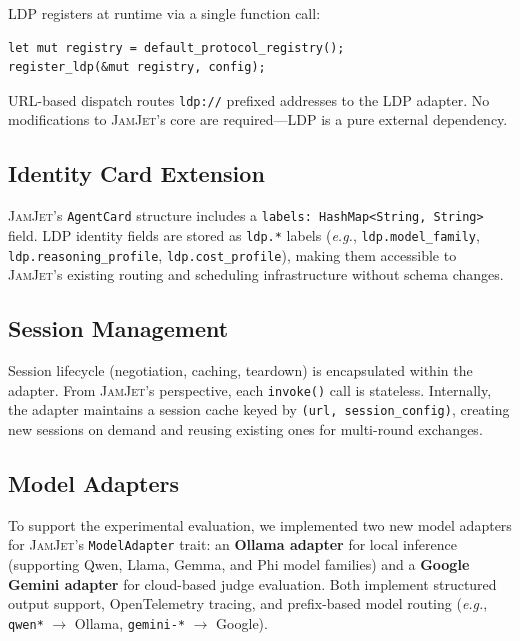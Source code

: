 \documentclass[11pt,a4paper]{article}
\newcommand{\ldp}{\textsc{LDP}}
\newcommand{\jamjet}{\textsc{JamJet}}
\newcommand{\eg}{\textit{e.g.}}
\begin{document}
\ldp{} registers at runtime via a single function call:

\begin{lstlisting}[style=protocol]
let mut registry = default_protocol_registry();
register_ldp(&mut registry, config);
\end{lstlisting}

\noindent URL-based dispatch routes \texttt{ldp://} prefixed addresses to the \ldp{} adapter. No modifications to \jamjet{}'s core are required---\ldp{} is a pure external dependency.

\subsection{Identity Card Extension}

\jamjet{}'s \texttt{AgentCard} structure includes a \texttt{labels: HashMap<String, String>} field. \ldp{} identity fields are stored as \texttt{ldp.*} labels (\eg{}, \texttt{ldp.model\_family}, \texttt{ldp.reasoning\_profile}, \texttt{ldp.cost\_profile}), making them accessible to \jamjet{}'s existing routing and scheduling infrastructure without schema changes.

\subsection{Session Management}

Session lifecycle (negotiation, caching, teardown) is encapsulated within the adapter. From \jamjet{}'s perspective, each \texttt{invoke()} call is stateless. Internally, the adapter maintains a session cache keyed by \texttt{(url, session\_config)}, creating new sessions on demand and reusing existing ones for multi-round exchanges.

\subsection{Model Adapters}

To support the experimental evaluation, we implemented two new model adapters for \jamjet{}'s \texttt{ModelAdapter} trait: an \textbf{Ollama adapter} for local inference (supporting Qwen, Llama, Gemma, and Phi model families) and a \textbf{Google Gemini adapter} for cloud-based judge evaluation. Both implement structured output support, OpenTelemetry tracing, and prefix-based model routing (\eg{}, \texttt{qwen*} $\rightarrow$ Ollama, \texttt{gemini-*} $\rightarrow$ Google).

\end{document}
